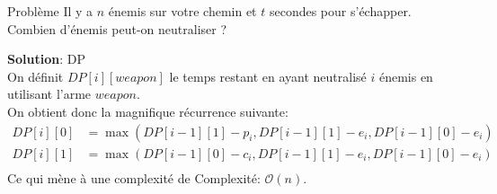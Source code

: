 \begin{frame}
    \frametitle{\problemtitle}
        \begin{block}
            {Problème} Il y a $n$ énemis sur votre chemin et $t$ secondes pour s'échapper. Combien d'énemis peut-on neutraliser ?
        \end{block}
        \pause
        \textbf{Solution}: DP \\
        \pause
        On définit $DP[i][weapon]$ le temps restant en ayant neutralisé $i$ énemis en utilisant l'arme $weapon$.\\
        \pause
        On obtient donc la magnifique récurrence suivante:\\
        \begin{align*}
            DP[i][0] &= \max(DP[i-1][1] - p_i, DP[i-1][1] - e_i, DP[i-1][0] - e_i)\\
            DP[i][1] &= \max(DP[i-1][0] - c_i, DP[i-1][1] - e_i, DP[i-1][0] - e_i)\\
        \end{align*}
        Ce qui mène à une complexité de Complexité: $\mathcal O(n)$.
\end{frame}